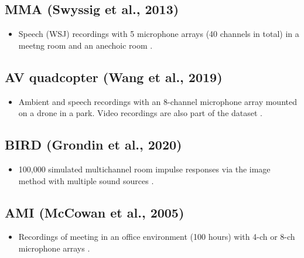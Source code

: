 \documentclass[14pt, legalpaper]{extarticle}
\begin{document}
\subsection{MMA (Swyssig et al., 2013)}

\begin{itemize}

\item Speech (WSJ) recordings with 5 microphone arrays (40 channels in total) in a meetng room and an anechoic room \cite{zwyssig2013recognition}.

\end{itemize}

\subsection{AV quadcopter (Wang et al., 2019)}

\begin{itemize}

\item Ambient and speech recordings with an 8-channel microphone array mounted on a drone in a park. Video recordings are also part of the dataset \cite{wang2019audio}.

\end{itemize}

\subsection{BIRD (Grondin et al., 2020)}

\begin{itemize}

\item 100,000 simulated multichannel room impulse responses via the image method with multiple sound sources \cite{grondin2020bird}.

\end{itemize}

\subsection{AMI (McCowan et al., 2005)}

\begin{itemize}

\item Recordings of meeting in an office environment (100 hours) with 4-ch or 8-ch microphone arrays \cite{mccowan2005ami}.

\end{itemize}
\end{document}
